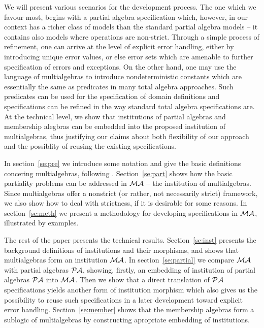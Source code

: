 \documentclass[10pt]{article}
\begin{document}
We will present various scenarios for the development process. The one which
we favour most, begins with a partial algebra specification which, however,
in our context has a richer class of models than the standard partial algebra
models -- it contains also models where operations are non-strict. Through a
simple process of refinement, one can arrive at the level of explicit error
handling, either by introducing unique error values, or else error sets which
are amenable to further specification of errors and exceptions. 
On the other hand, one may use the language of multialgebras to introduce
nondeterministic constants which are essentially the same as predicates in many
total algebra approaches. Such predicates can be used for the specification
of domain definitions and specifications can be refined in the way standard
total algebra specifications are. At the technical level, we show that
institutions of partial algebras and membership alegbras can be embedded into
the proposed institution of multialgebras, thus justifying our claims about
both flexibility of our approach and the possiblity of reusing the existing
specifications.

In section~\ref{se:pre} we introduce some notation and give the basic
definitions concering multialgebras, following \cite{multi}.
Section~\ref{se:part} shows how the basic partiality problems can be
addressed in ${\mathcal{MA}}$ -- the institution of multialgebras.  Since
multialgebras offer a nonstrict (or rather, not necessarily strict)
framework, we also show how to deal with strictness, if it is desirable for
some reasons.  In section~\ref{se:meth} we present a methodology for
developing specifications in ${\mathcal{MA}}$, illustrated by examples.

The rest of the paper presents the technical results.  Section~\ref{se:inst}
presents the background definitions of institutions \cite{inst} and their
morphisms, and shows that multialgebras form an institution
${\mathcal{MA}}$. 
In section~\ref{se:partial} we compare
${\mathcal{MA}}$ with partial algebras ${\mathcal{PA}}$, showing, firstly, an embedding
of institution of partial algebras ${\mathcal{PA}}$ into ${\mathcal{MA}}$. Then we show
that a direct translation of ${\mathcal{PA}}$ specifications yields another form
of institution morphism which also gives us the possibility to reuse such
specifications in a later development toward explicit error handling.
Section~\ref{se:member} shows that the membership algebras \cite{member} form
a sublogic of multialgebras by constructing apropriate embedding
of institutions.
\end{document}
